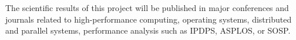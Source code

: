 \documentclass[a4paper,11pt,defblank]{article}
\newcommand{\gael}[1]{\mynote{Ga\"el}{#1}}
\begin{document}
The scientific results of this project will be published in major
conferences and journals related to high-performance computing,
operating systems, distributed and parallel systems, performance
analysis such as IPDPS, ASPLOS, or SOSP.



% 
% 
% 
% 
% 
% 
% 
% 
\end{document}
